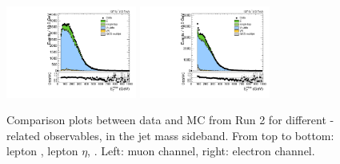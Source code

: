 \begin{figure}[htbp]
  \includegraphics[width=0.3825\textwidth]{fig/analysisAppendix/SB_b1_mu_allP_allC_allD_Run2_met_pt.pdf}
  \includegraphics[width=0.3825\textwidth]{fig/analysisAppendix/SB_b1_e_allP_allC_allD_Run2_met_pt.pdf}\\
  \caption{
    Comparison plots between data and MC from Run 2 for different \Wlep-related observables, in the jet mass sideband.
    From top to bottom: lepton \pt, lepton $\eta$, \ptmiss.
    Left: muon channel, right: electron channel.
  }
  \label{fig:SB_controlPlotsRun2_1}
\end{figure}

